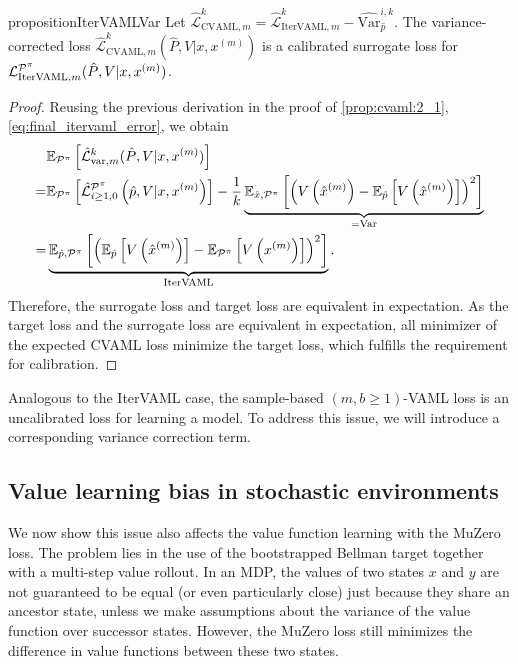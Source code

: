 \begin{restatable}{proposition}{IterVAMLVar}\label{prop:cvaml:2_2}
    Let $\hat{\mathcal{L}}_{\mathrm{CVAML}, m}^{k} = \hat{\mathcal{L}}^k_{\mathrm{IterVAML}, m} - \widehat{\mathrm{Var}}_{\hat{p}}^{i,k}.$
    The variance-corrected loss $\hat{\mathcal{L}}_{\mathrm{CVAML}, m}^{k}(\hat{P}, V|x, x^{(m)})$ is a calibrated surrogate loss for $\mathcal{L}_{\mathrm{IterVAML}, m}^{\P^\pi}(\hat{P}, V|x, x^{(m)})$.
\end{restatable}
\begin{proof}
Reusing the previous derivation in the proof of \autoref{prop:cvaml:2_1}, \autoref{eq:final_itervaml_error}, we obtain
\begin{align}
    & \EEX{\P^\pi}{\hat{\mathcal{L}}_{\mathrm{var}, m}^{k}(\hat{P}, V|x, x^{(m)})} \\
    = &\EEX{\P^\pi}{\hat{\mathcal{L}}^{\P^\pi}_{i\geq1,0}\left(\hat{p},V|x,x^{(m)}\right)} - \frac{1}{k}\underbrace{\EEX{\hat{x},\P^\pi}{\left(V\left(\hat{x}^{(m)}\right) - \EEX{\hat{p}}{V\left(\hat{x}^{(m)}\right)}\right)^2}}_{= \mathrm{Var}}\\
    = & \underbrace{\EEX{\hat{p},\P^\pi}{\left(\EEX{\hat{p}}{V\left(\hat{x}^{(m)}\right)} - \EEX{\P^\pi}{V\left(x^{(m)}\right)}\right)^2}}_{\mathrm{IterVAML}}.
\end{align}
Therefore, the surrogate loss and target loss are equivalent in expectation.
As the target loss and the surrogate loss are equivalent in expectation, all minimizer of the expected CVAML loss minimize the target loss, which fulfills the requirement for calibration.
\end{proof}

Analogous to the IterVAML case, the sample-based $(m,b \geq 1)$-VAML loss is an uncalibrated loss for learning a model.
To address this issue, we will introduce a corresponding variance correction term.

\subsection{Value learning bias in stochastic environments}
\label{sec:cvaml:muzero_bias}

We now show this issue also affects the value function learning with the MuZero loss.
The problem lies in the use of the bootstrapped Bellman target together with a multi-step value rollout.
In an MDP, the values of two states $x$ and $y$ are not guaranteed to be equal (or even particularly close) just because they share an ancestor state, unless we make assumptions about the variance of the value function over successor states.
However, the MuZero loss still minimizes the difference in value functions between these two states.


